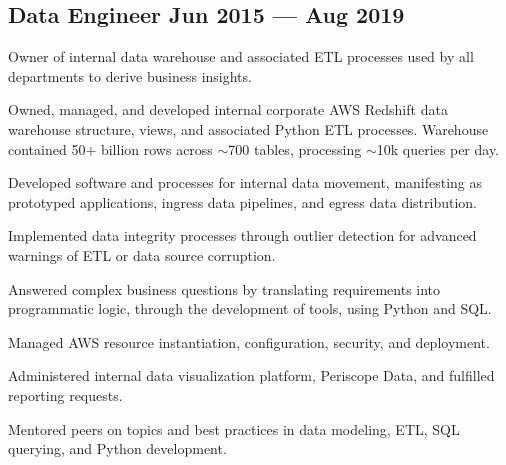 \documentclass[letter,10pt]{article}
\begin{document}
\subsection{{Data Engineer \hfill Jun 2015 --- Aug 2019}}

\vspace{10pt}

Owner of internal data warehouse and associated ETL processes used by all departments to derive business insights.


\vspace{10pt}

\begin{zitemize}
    \item Owned, managed, and developed internal corporate AWS Redshift data warehouse structure, views, and associated Python ETL processes. Warehouse contained 50+ billion rows across $\sim$700 tables, processing $\sim$10k queries per day.
    \item Developed software and processes for internal data movement, manifesting as prototyped applications, ingress data pipelines, and egress data distribution.
    \item Implemented data integrity processes through outlier detection for advanced warnings of ETL or data source corruption.
    \item Answered complex business questions by translating requirements into programmatic logic, through the development of tools, using Python and SQL.
    \item Managed AWS resource instantiation, configuration, security, and deployment.
    \item Administered internal data visualization platform, Periscope Data, and fulfilled reporting requests.
    \item Mentored peers on topics and best practices in data modeling, ETL, SQL querying, and Python development.
\end{zitemize}

\vspace{5pt}
\end{document}
